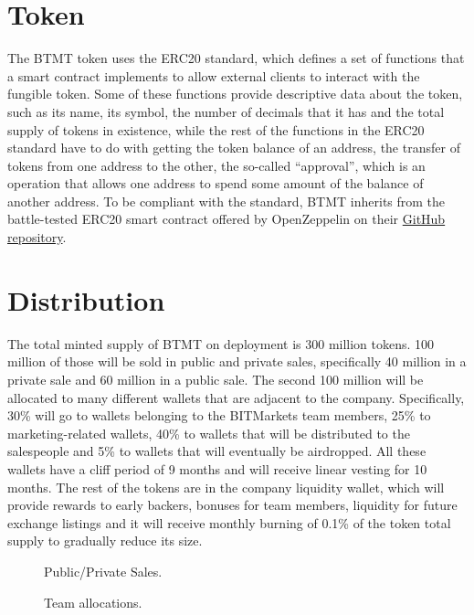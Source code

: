 \documentclass[a4paper,12pt]{article}
\begin{document}
\section{Token}

The BTMT token uses the ERC20 standard, which defines a set of functions that a smart contract implements to allow external clients to interact with the fungible
token. Some of these functions provide descriptive data about the token, such as its name, its symbol, the number of decimals that it has and the total supply of tokens in existence, while the rest of the functions in the ERC20 standard have to do with getting the token balance of an address,
the transfer of tokens from one address to the other,
the so-called ``approval'', which is an operation that allows one address to spend some amount of the balance of another address. To be compliant with the standard, BTMT inherits from the battle-tested ERC20 smart contract offered by OpenZeppelin on their \href{https://github.com/OpenZeppelin/openzeppelin-contracts/blob/master/contracts/token/ERC20/ERC20.sol}{GitHub repository}.

\section{Distribution}
The total minted supply of BTMT on deployment is 300 million tokens.
100 million of those will be sold in public and private sales, specifically 40 million in a private sale and 60 million in a public sale.
The second 100 million will be allocated to many different wallets that are adjacent to the company. Specifically, 30\% will go to wallets belonging to the BITMarkets team members, 25\% to marketing-related wallets, 40\% to wallets that will be distributed to the salespeople and 5\% to wallets that will eventually be airdropped. All these wallets have a cliff period of 9 months and will receive linear vesting for 10 months. The rest of the tokens are in the company liquidity wallet, which will provide rewards to early backers, bonuses for team members, liquidity for future exchange listings and it will receive monthly burning of 0.1\% of the token total supply to gradually reduce its size.

\begin{figure}[h!]
\centering

\begin{minipage}[3cm]{.45\textwidth}
\centering
{}
\caption{Public/Private Sales.}
\end{minipage}\qquad
\begin{minipage}[3cm]{.45\textwidth}
\centering
{}
\caption{Team allocations.}
\label{fig:allocations}
\end{minipage}

\end{figure}
\end{document}
